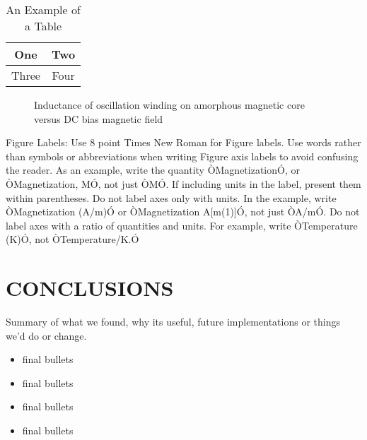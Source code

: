 \documentclass[letterpaper, 10 pt, conference]{ieeeconf}  %
\begin{document}
\begin{table}[h]
\caption{An Example of a Table}
\label{table_example}
\begin{center}
\begin{tabular}{|c||c|}
\hline
One & Two\\
\hline
Three & Four\\
\hline
\end{tabular}
\end{center}
\end{table}


   \begin{figure}[thpb]
      \centering
      \caption{Inductance of oscillation winding on amorphous
       magnetic core versus DC bias magnetic field}
      \label{figurelabel}
   \end{figure}
   

Figure Labels: Use 8 point Times New Roman for Figure labels. Use words rather than symbols or abbreviations when writing Figure axis labels to avoid confusing the reader. As an example, write the quantity ÒMagnetizationÓ, or ÒMagnetization, MÓ, not just ÒMÓ. If including units in the label, present them within parentheses. Do not label axes only with units. In the example, write ÒMagnetization (A/m)Ó or ÒMagnetization {A[m(1)]}Ó, not just ÒA/mÓ. Do not label axes with a ratio of quantities and units. For example, write ÒTemperature (K)Ó, not ÒTemperature/K.Ó


\section{CONCLUSIONS}

Summary of what we found, why its useful, future implementations or things we'd do or change.

\begin{itemize}

\item final bullets 
\item final bullets 
\item final bullets 
\item final bullets 
\end{itemize}

\addtolength{\textheight}{-12cm}   %
\end{document}
